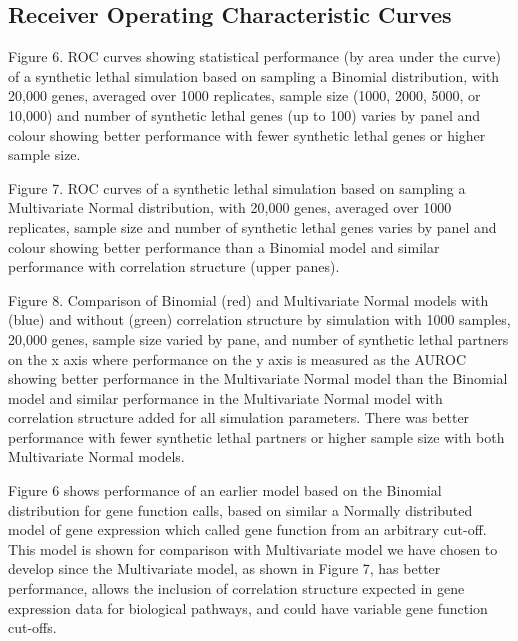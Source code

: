 \subsection{Receiver Operating Characteristic Curves}

Figure 6.   \gls{ROC} curves showing statistical performance (by area under the curve) of a \gls{synthetic lethal} simulation based on sampling a Binomial distribution, with 20,000 genes, averaged over 1000 replicates, sample size (1000, 2000, 5000, or 10,000) and number of \gls{synthetic lethal} genes (up to 100) varies by panel and colour showing better performance with fewer \gls{synthetic lethal} genes or higher sample size.    

Figure 7.   \gls{ROC} curves of a \gls{synthetic lethal} simulation based on sampling a Multivariate Normal distribution, with 20,000 genes, averaged over 1000 replicates, sample size and number of \gls{synthetic lethal} genes varies by panel and colour showing better performance than a Binomial model and similar performance with correlation structure (upper panes).

Figure 8.  Comparison of Binomial (red) and Multivariate Normal models with (blue) and without (green) correlation structure by simulation with 1000 samples, 20,000 genes, sample size varied by pane, and number of \gls{synthetic lethal} partners on the x axis where performance on the y axis is measured as the \gls{AUROC} showing better performance in the Multivariate Normal model than the Binomial model and similar performance in the Multivariate Normal model with correlation structure added for all simulation parameters.  There was better performance with fewer \gls{synthetic lethal} partners or higher sample size with both Multivariate Normal models.   

Figure 6 shows performance of an earlier model based on the Binomial distribution for gene function calls, based on similar a Normally distributed model of \gls{gene expression} which called gene function from an arbitrary  cut-off.  This model is shown for comparison with Multivariate model we have chosen to develop since the Multivariate model, as shown in Figure 7, has better performance, allows the inclusion of correlation structure expected in \gls{gene expression} data for biological pathways, and could have variable gene function cut-offs.  

